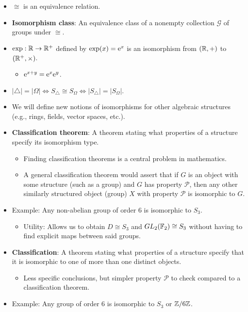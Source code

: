 \documentclass[../notes.tex]{subfiles}
\begin{document}
\begin{itemize}
    \item $\cong$ is an equivalence relation.
    \item \textbf{Isomorphism class}: An equivalence class of a nonempty collection $\mathcal{G}$ of groups under $\cong$.
    \item $\exp:\R\to\R^+$ defined by $\exp(x)=\e[x]$ is an isomorphism from $(\R,+)$ to $(\R^+,\times)$.
    \begin{itemize}
        \item $\e[x+y]=\e[x]\e[y]$.
    \end{itemize}
    \item $|\triangle|=|\Omega|\Longleftrightarrow S_\triangle\cong S_\Omega\Longleftrightarrow|S_\triangle|=|S_\Omega|$.
    \item We will define new notions of isomorphisms for other algebraic structures (e.g., rings, fields, vector spaces, etc.).
    \item \textbf{Classification theorem}: A theorem stating what properties of a structure specify its isomorphism type.
    \begin{itemize}
        \item Finding classification theorems is a central problem in mathematics.
        \item A general classification theorem would assert that if $G$ is an object with some structure (such as a group) and $G$ has property $\mathcal{P}$, then any other similarly structured object (group) $X$ with property $\mathcal{P}$ is isomorphic to $G$.
    \end{itemize}
    \item Example: Any non-abelian group of order 6 is isomorphic to $S_3$.
    \begin{itemize}
        \item Utility: Allows us to obtain $D\cong S_3$ and $GL_2(\F_2)\cong S_3$ without having to find explicit maps between said groups.
    \end{itemize}
    \item \textbf{Classification}: A theorem stating what properties of a structure specify that it is isomorphic to one of more than one distinct objects.
    \begin{itemize}
        \item Less specific conclusions, but simpler property $\mathcal{P}$ to check compared to a classification theorem.
    \end{itemize}
    \item Example: Any group of order 6 is isomorphic to $S_3$ or $\Z/6\Z$.

\end{itemize}
\end{document}
